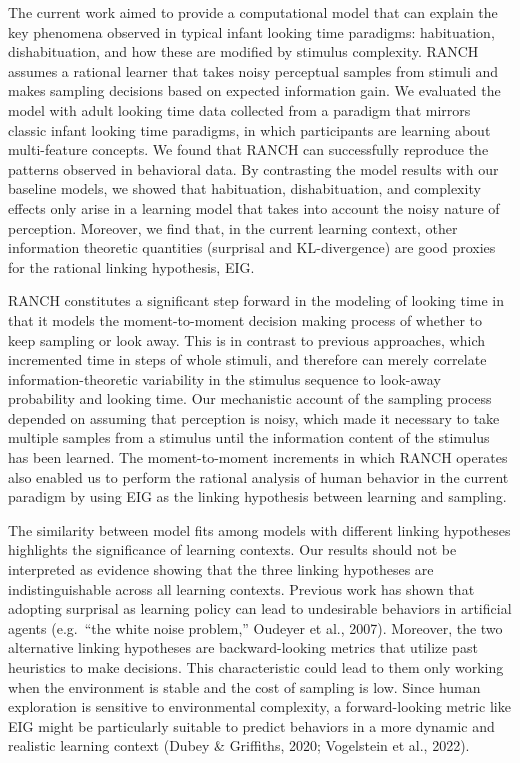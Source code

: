 \documentclass[10pt, letterpaper]{article}
\begin{document}
The current work aimed to provide a computational model that can explain
the key phenomena observed in typical infant looking time paradigms:
habituation, dishabituation, and how these are modified by stimulus
complexity. RANCH assumes a rational learner that takes noisy perceptual
samples from stimuli and makes sampling decisions based on expected
information gain. We evaluated the model with adult looking time data
collected from a paradigm that mirrors classic infant looking time
paradigms, in which participants are learning about multi-feature
concepts. We found that RANCH can successfully reproduce the patterns
observed in behavioral data. By contrasting the model results with our
baseline models, we showed that habituation, dishabituation, and
complexity effects only arise in a learning model that takes into
account the noisy nature of perception. Moreover, we find that, in the
current learning context, other information theoretic quantities
(surprisal and KL-divergence) are good proxies for the rational linking
hypothesis, EIG.

RANCH constitutes a significant step forward in the modeling of looking
time in that it models the moment-to-moment decision making process of
whether to keep sampling or look away. This is in contrast to previous
approaches, which incremented time in steps of whole stimuli, and
therefore can merely correlate information-theoretic variability in the
stimulus sequence to look-away probability and looking time. Our
mechanistic account of the sampling process depended on assuming that
perception is noisy, which made it necessary to take multiple samples
from a stimulus until the information content of the stimulus has been
learned. The moment-to-moment increments in which RANCH operates also
enabled us to perform the rational analysis of human behavior in the
current paradigm by using EIG as the linking hypothesis between learning
and sampling.

The similarity between model fits among models with different linking
hypotheses highlights the significance of learning contexts. Our results
should not be interpreted as evidence showing that the three linking
hypotheses are indistinguishable across all learning contexts. Previous
work has shown that adopting surprisal as learning policy can lead to
undesirable behaviors in artificial agents (e.g.~{``the white noise
problem,''} Oudeyer et al., 2007). Moreover, the two alternative linking
hypotheses are backward-looking metrics that utilize past heuristics to
make decisions. This characteristic could lead to them only working when
the environment is stable and the cost of sampling is low. Since human
exploration is sensitive to environmental complexity, a forward-looking
metric like EIG might be particularly suitable to predict behaviors in a
more dynamic and realistic learning context (Dubey \& Griffiths, 2020;
Vogelstein et al., 2022).
\end{document}

